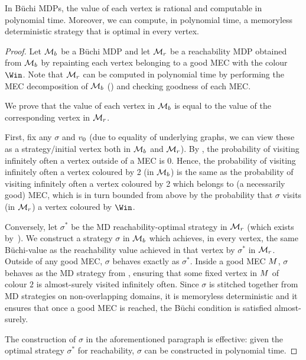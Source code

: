 \begin{theorem}
\label{5-thm:quant-buchi}
In B{\"u}chi MDPs, the value of each vertex is rational and computable in polynomial time. Moreover, we can compute, in polynomial time, a memoryless deterministic strategy that is optimal in every vertex.
\end{theorem}
\begin{proof}
Let $\mathcal{M}_b$ be a B{\"u}chi MDP and let $\mathcal{M}_r$ be a reachability MDP obtained from $\mathcal{M}_b$ by repainting each vertex belonging to a good MEC with the colour $\Win$. Note that $\mathcal{M}_r$ can be computed in polynomial time by performing the MEC decomposition of $\mathcal{M}_b$ () and checking goodness of each MEC.

We prove that the value of each vertex in $\mathcal{M}_b$ is equal to the value of the corresponding vertex in $\mathcal{M}_r$.

First, fix any $\sigma$ and $v_0$ (due to equality of underlying graphs, we can view these as a strategy/initial vertex both in $\mathcal{M}_b$ and $\mathcal{M}_r$). By , the probability of visiting infinitely often a vertex outside of a MEC is 0. Hence, the probability of visiting infinitely often a vertex coloured by 2 (in $\mathcal{M}_b$) is the same as the probability of visiting infinitely often a vertex coloured by 2 which belongs to (a necessarily good) MEC, which is in turn bounded from above by the probability that $\sigma$ visits (in $\mathcal{M}_r$) a vertex coloured by $\Win$.

Conversely, let $\sigma^*$ be the MD reachability-optimal strategy in $\mathcal{M}_r$ (which exists by~). We construct a strategy $\sigma$ in $\mathcal{M}_b$ which achieves, in every vertex, the same B{\"u}chi-value as the reachability value achieved in that vertex by $\sigma^*$ in $\mathcal{M}_r$. Outside of any good MEC, $\sigma$ behaves exactly as $\sigma^*$. Inside a good MEC $M$, $\sigma$ behaves as the MD strategy from , ensuring that some fixed vertex in $M$ of colour $2$ is almost-surely visited infinitely often. Since $\sigma$ is stitched together from MD strategies on non-overlapping domains, it is memoryless deterministic and it ensures that once a good MEC is reached, the B{\"u}chi condition is satisfied almost-surely.

The construction of $\sigma$ in the aforementioned paragraph is effective: given the optimal strategy $\sigma^*$ for reachability, $\sigma$ can be constructed in polynomial time.
\end{proof}

